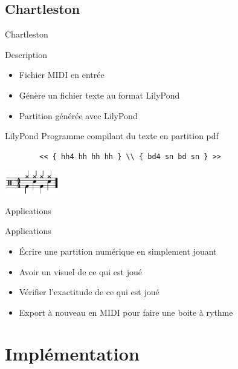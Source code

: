 \documentclass{beamer}
\begin{document}
\subsection{Chartleston}

\begin{frame}[containsverbatim]{Chartleston}
\begin{block}{Description}
        \begin{itemize}
            \item Fichier MIDI en entrée
            \item Génère un fichier texte au format LilyPond
            \item Partition générée avec LilyPond
        \end{itemize}
    \end{block}
    \begin{block}{LilyPond}
        Programme compilant du texte en partition pdf
        \begin{verbatim}
        << { hh4 hh hh hh } \\ { bd4 sn bd sn } >>
        \end{verbatim}
        \begin{center}
            \includegraphics[height=1cm]{figures/lilypond.pdf}
        \end{center}
    \end{block}
\end{frame}

\begin{frame}{Applications}
    \begin{block}{Applications}
        \begin{itemize}
            \item Écrire une partition numérique en simplement jouant
            \item Avoir un visuel de ce qui est joué
            \item Vérifier l’exactitude de ce qui est joué
            \item Export à nouveau en MIDI pour faire une boite à rythme
        \end{itemize}
    \end{block}
\end{frame}

\section{Implémentation}
\end{document}
